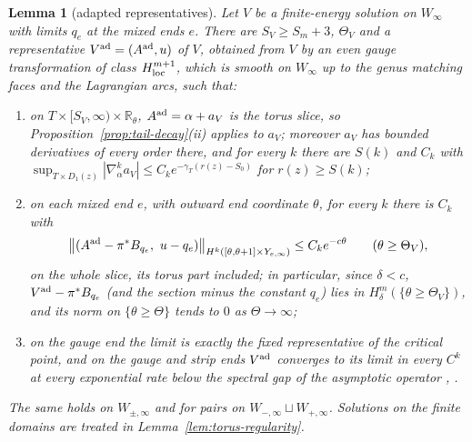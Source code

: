 \documentclass[11pt]{amsart}
\newtheorem{lemma}[theorem]{Lemma}
\theoremstyle{definition}
\theoremstyle{remark}
\theoremstyle{plain}
\numberwithin{equation}{section}
\newcommand{\RR}{\mathbb{R}}
\begin{document}
\begin{lemma}[adapted representatives]\label{lem:adapted}
Let $V$ be a finite-energy solution on $W_\infty$ with limits $q_e$ at the mixed
ends $e$. There are $S_V\ge S_m+3$, $\Theta_V$ and a representative $V^{\rm ad}=(A^{\rm ad},u)$ of
$V$, obtained from $V$ by an even gauge transformation of class $H^{m+1}_{\rm loc}$, which is
smooth on $W_\infty$ up to the genus matching faces and the Lagrangian arcs, such that:
\begin{enumerate}[label=(\roman*)]
\item on $T\times[S_V,\infty)\times\RR_\theta$, $A^{\rm ad}=\alpha+a_V$ is the torus slice, so
  Proposition~\ref{prop:tail-decay}(ii) applies to $a_V$; moreover $a_V$ has bounded
  derivatives of every order there, and for every $k$ there are $S(k)$ and $C_k$ with
  $\sup_{T\times D_1(z)}|\nabla^k_\alpha a_V|\le C_ke^{-\gamma_T(r(z)-S_0)}$ for $r(z)\ge S(k)$;
\item on each mixed end $e$, with outward end coordinate $\theta$, for every $k$ there is $C_k$
  with
  \[
  \bigl\|(A^{\rm ad}-\pi^*B_{q_e},\ u-q_e)\bigr\|_{H^k([\theta,\theta+1]\times Y_{e,\infty})}\le C_ke^{-c\theta}
  \qquad(\theta\ge\Theta_V),
  \]
  on the whole slice, its torus part included; in particular, since $\delta<c$,
  $V^{\rm ad}-\pi^*B_{q_e}$ (and the section minus the constant $q_e$) lies in
  $H^m_\delta(\{\theta\ge\Theta_V\})$, and its norm on $\{\theta\ge\Theta\}$ tends to $0$
  as $\Theta\to\infty$;
\item on the gauge end the limit is exactly the fixed representative of the critical
  point, and on the gauge and strip ends $V^{\rm ad}$ converges to its limit in every $C^k$ at
  every exponential rate below the spectral gap of the asymptotic operator
  \cite[Section~4.1]{Donaldson-book}, \cite{RS-strips}.
\end{enumerate}
The same holds on $W_{\pm,\infty}$ and for pairs on $W_{-,\infty}\sqcup W_{+,\infty}$. Solutions on the
finite domains are treated in Lemma~\ref{lem:torus-regularity}.
\end{lemma}
\end{document}
